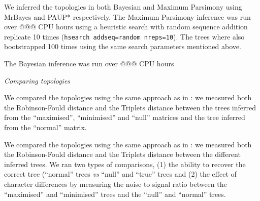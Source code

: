 \documentclass[12pt,letterpaper]{article}
\renewcommand{\subsection}[1]{%
\bigskip
\begin{center}
\begin{large}
\normalfont\itshape #1
\end{large}
\end{center}}
\begin{document}
We inferred the topologies in both Bayesian and Maximum Parsimony using MrBayes \citep[v3.2.6;][]{Ronquist2012mrbayes} and PAUP* \citep[v4.0a151;][]{swofford2001paup} respectively.
The Maximum Parsimony inference was run over @@@ CPU hours using a heuristic search with random sequence addition replicate 10 times (\texttt{hsearch addseq=random nreps=10}).
The trees where also bootstrapped 100 times using the same search parameters mentioned above.

The Bayesian inference was run over @@@ CPU hours





\subsection{Comparing topologies}

We compared the topologies using the same approach as in \cite{Guillerme2016146}: we measured both the Robinson-Fould distance \citep{RF1981} and the Triplets distance \citep{dobson1975triplets} between the trees inferred from the ``maximised'', ``minimised'' and ``null'' matrices and the tree inferred from the ``normal'' matrix.

We compared the topologies using the same approach as in \cite{Guillerme2016146}: we measured both the Robinson-Fould distance \citep{RF1981} and the Triplets distance \citep{dobson1975triplets} between the different inferred trees.
We ran two types of comparisons, (1) the ability to recover the correct tree (``normal'' trees \textit{vs} ``null'' and ``true'' trees and (2) the effect of character differences by measuring the noise to signal ratio between the ``maximised'' and ``minimised'' trees and the ``null'' and ``normal'' trees.
\end{document}
